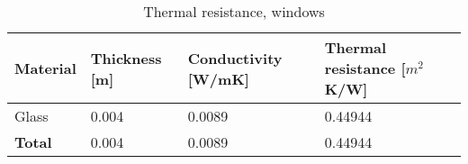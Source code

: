 \begin{table}[h!]
    \centering
        \caption{Thermal resistance, windows}
    \begin{tabular}{p{2cm}|p{1.8cm}|p{2.5cm}|p{2cm}}
         \textbf{Material} & \textbf{Thickness [m]} & \textbf{Conductivity} [W/mK] & \textbf{Thermal resistance [$m^2$K/W]} \\
         \hline
         Glass & 0.004 & 0.0089 & 0.44944 \\
         \hline
         \textbf{Total} & 0.004 & 0.0089 & 0.44944 \\
    \end{tabular}
    \label{tab:Rvalue, windows}
\end{table}



